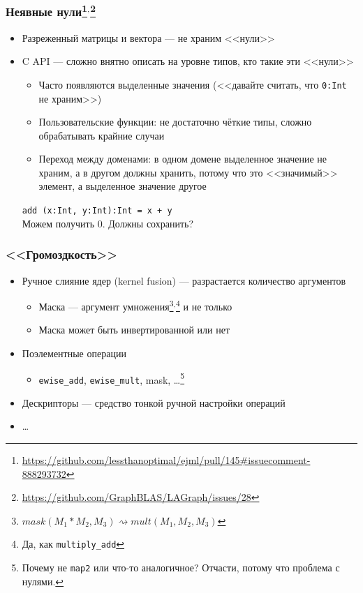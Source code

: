 \documentclass[xcolor=table,aspectratio=169]{beamer}
\begin{document}
\begin{frame}[fragile]
  \frametitle{Неявные нули\footnote{\url{https://github.com/lessthanoptimal/ejml/pull/145\#issuecomment-888293732}}$^{,}$\footnote{\url{https://github.com/GraphBLAS/LAGraph/issues/28}}}
  \begin{itemize}
    \item Разреженный матрицы и вектора --- не храним <<нули>>
    \item C API --- сложно внятно описать на уровне типов, кто такие эти <<нули>>
    \begin{itemize}
      \item Часто появляются выделенные значения (<<давайте считать, что \texttt{0:Int} не храним>>)
      \item Пользовательские функции: не достаточно чёткие типы, сложно обрабатывать крайние случаи
      \item Переход между доменами: в одном домене выделенное значение не храним, а в другом должны хранить, потому что это <<значимый>> элемент, а выделенное значение другое    
    \end{itemize}    
    \vfill
    \texttt{add (x:Int, y:Int):Int = x + y}
    \\ Можем получить 0. Должны сохранить?
  \end{itemize}
\end{frame}

\begin{frame}[fragile]
  \frametitle{<<Громоздкость>>}
  \begin{itemize}
    \item Ручное слияние ядер (kernel fusion) --- разрастается количество аргументов
    \begin{itemize}
      \item Маска --- аргумент умножения\footnote{$mask(M_1 * M_2, M_3) 	\rightsquigarrow mult(M_1,M_2,M_3)$}$^{,}$\footnote{Да, как \texttt{multiply\_add}} и не только
      \item Маска может быть инвертированной или нет      
    \end{itemize}
    \item Поэлементные операции
    \begin{itemize}
      \item \texttt{ewise\_add}, \texttt{ewise\_mult}, mask, \ldots\footnote{Почему не \texttt{map2} или что-то аналогичное? Отчасти, потому что проблема с нулями.}
    \end{itemize}
    \item Дескрипторы --- средство тонкой ручной настройки операций
    \item \ldots
  \end{itemize}
\end{frame}
\end{document}
